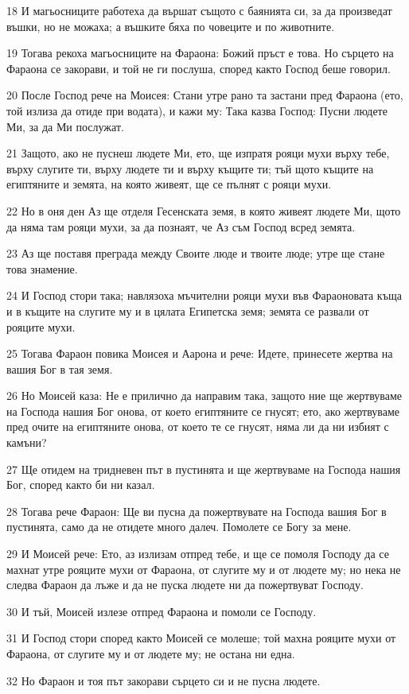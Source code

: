 \par 18 И магьосниците работеха да вършат същото с баянията си, за да произведат въшки, но не можаха; а въшките бяха по човеците и по животните.
\par 19 Тогава рекоха магьосниците на Фараона: Божий пръст е това. Но сърцето на Фараона се закорави, и той не ги послуша, според както Господ беше говорил.
\par 20 После Господ рече на Моисея: Стани утре рано та застани пред Фараона (ето, той излиза да отиде при водата), и кажи му: Така казва Господ: Пусни людете Ми, за да Ми послужат.
\par 21 Защото, ако не пуснеш людете Ми, ето, ще изпратя рояци мухи върху тебе, върху слугите ти, върху людете ти и върху къщите ти; тъй щото къщите на египтяните и земята, на която живеят, ще се пълнят с рояци мухи.
\par 22 Но в оня ден Аз ще отделя Гесенската земя, в която живеят людете Ми, щото да няма там рояци мухи, за да познаят, че Аз съм Господ всред земята.
\par 23 Аз ще поставя преграда между Своите люде и твоите люде; утре ще стане това знамение.
\par 24 И Господ стори така; навлязоха мъчителни рояци мухи във Фараоновата къща и в къщите на слугите му и в цялата Египетска земя; земята се развали от рояците мухи.
\par 25 Тогава Фараон повика Моисея и Аарона и рече: Идете, принесете жертва на вашия Бог в тая земя.
\par 26 Но Моисей каза: Не е прилично да направим така, защото ние ще жертвуваме на Господа нашия Бог онова, от което египтяните се гнусят; ето, ако жертвуваме пред очите на египтяните онова, от което те се гнусят, няма ли да ни избият с камъни?
\par 27 Ще отидем на тридневен път в пустинята и ще жертвуваме на Господа нашия Бог, според както би ни казал.
\par 28 Тогава рече Фараон: Ще ви пусна да пожертвувате на Господа вашия Бог в пустинята, само да не отидете много далеч. Помолете се Богу за мене.
\par 29 И Моисей рече: Ето, аз излизам отпред тебе, и ще се помоля Господу да се махнат утре рояците мухи от Фараона, от слугите му и от людете му; но нека не следва Фараон да лъже и да не пуска людете ни да пожертвуват Господу.
\par 30 И тъй, Моисей излезе отпред Фараона и помоли се Господу.
\par 31 И Господ стори според както Моисей се молеше; той махна рояците мухи от Фараона, от слугите му и от людете му; не остана ни една.
\par 32 Но Фараон и тоя път закорави сърцето си и не пусна людете.

